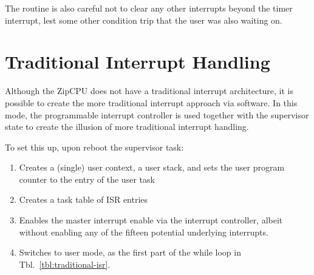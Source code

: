 \documentclass{gqtekspec}
\begin{document}
The routine is also careful not to clear any other interrupts beyond the timer
interrupt, lest some other condition trip that the user was also waiting on.

\section{Traditional Interrupt Handling}
Although the ZipCPU does not have a traditional interrupt architecture,
it is possible to create the more traditional interrupt approach via software.
In this mode, the programmable interrupt controller is used together with the
supervisor state to create the illusion of more traditional interrupt handling.

To set this up, upon reboot the supervisor task:
\begin{enumerate}
\item Creates a (single) user context, a user stack, and sets the user
	program counter to the entry of the user task
\item Creates a task table of ISR entries
\item Enables the master interrupt enable via the interrupt controller, albeit
	without enabling any of the fifteen potential underlying interrupts.
\item Switches to user mode, as the first part of the while loop in 
	Tbl.~\ref{tbl:traditional-isr}.
\end{enumerate}
\end{document}
